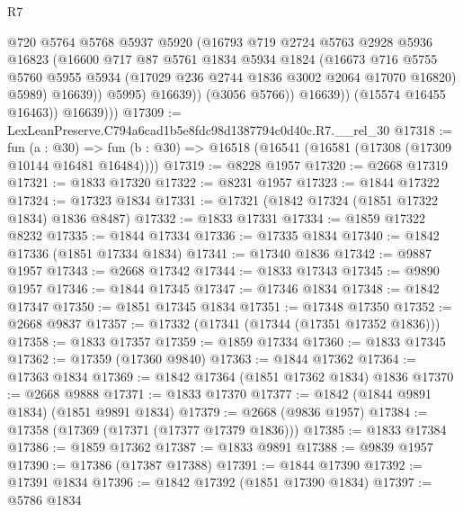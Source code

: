 \begin{lexlean}{R7}
\begin{coremodule}
                        @720
                        @5764
                        @5768
                        @5937
                        @5920
                        (@16793
                          @719
                          @2724
                          @5763
                          @2928
                          @5936
                          @16823
                          (@16600
                            @717
                            @87
                            @5761
                            @1834
                            @5934
                            @1824
                            (@16673
                              @716
                              @5755
                              @5760
                              @5955
                              @5934
                              (@17029 @236 @2744 @1836 @3002 @2064 @17070 @16820)
                              @5989)
                            @16639))
                        @5995)
                      @16639))
                  (@3056 @5766))
                @16639))
            (@15574 @16455 @16463))
          @16639)))
@17309 := LexLeanPreserve.C794a6cad1b5e8fdc98d1387794c0d40c.R7.__rel_30
@17318 := fun (a : @30) =>
  fun (b : @30) => @16518 (@16541 (@16581 (@17308 (@17309 @10144 @16481 @16484))))
@17319 := @8228 @1957
@17320 := @2668 @17319
@17321 := @1833 @17320
@17322 := @8231 @1957
@17323 := @1844 @17322
@17324 := @17323 @1834
@17331 := @17321 (@1842 @17324 (@1851 @17322 @1834) @1836 @8487)
@17332 := @1833 @17331
@17334 := @1859 @17322 @8232
@17335 := @1844 @17334
@17336 := @17335 @1834
@17340 := @1842 @17336 (@1851 @17334 @1834)
@17341 := @17340 @1836
@17342 := @9887 @1957
@17343 := @2668 @17342
@17344 := @1833 @17343
@17345 := @9890 @1957
@17346 := @1844 @17345
@17347 := @17346 @1834
@17348 := @1842 @17347
@17350 := @1851 @17345 @1834
@17351 := @17348 @17350
@17352 := @2668 @9837
@17357 := @17332 (@17341 (@17344 (@17351 @17352 @1836)))
@17358 := @1833 @17357
@17359 := @1859 @17334
@17360 := @1833 @17345
@17362 := @17359 (@17360 @9840)
@17363 := @1844 @17362
@17364 := @17363 @1834
@17369 := @1842 @17364 (@1851 @17362 @1834) @1836
@17370 := @2668 @9888
@17371 := @1833 @17370
@17377 := @1842 (@1844 @9891 @1834) (@1851 @9891 @1834)
@17379 := @2668 (@9836 @1957)
@17384 := @17358 (@17369 (@17371 (@17377 @17379 @1836)))
@17385 := @1833 @17384
@17386 := @1859 @17362
@17387 := @1833 @9891
@17388 := @9839 @1957
@17390 := @17386 (@17387 @17388)
@17391 := @1844 @17390
@17392 := @17391 @1834
@17396 := @1842 @17392 (@1851 @17390 @1834)
@17397 := @5786 @1834

\end{coremodule}
\end{lexlean}
